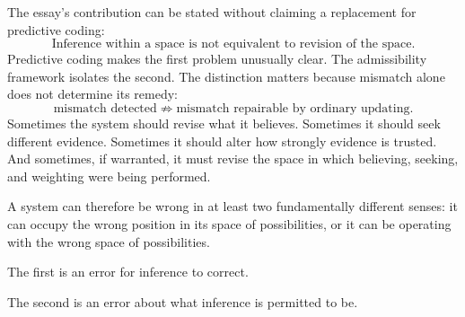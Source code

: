 \documentclass[11pt]{article}
\begin{document}
The essay's contribution can be stated without claiming a replacement for predictive coding:
\[
\boxed{\text{Inference within a space is not equivalent to revision of the space.}}
\]
Predictive coding makes the first problem unusually clear. The admissibility framework isolates the second. The distinction matters because mismatch alone does not determine its remedy:
\[
\text{mismatch detected} \;\not\Rightarrow\; \text{mismatch repairable by ordinary updating.}
\]
Sometimes the system should revise what it believes. Sometimes it should seek different evidence. Sometimes it should alter how strongly evidence is trusted. And sometimes, if warranted, it must revise the space in which believing, seeking, and weighting were being performed.

A system can therefore be wrong in at least two fundamentally different senses: it can occupy the wrong position in its space of possibilities, or it can be operating with the wrong space of possibilities.

The first is an error for inference to correct.

The second is an error about what inference is permitted to be.
\end{document}
